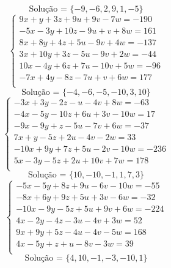 \documentclass[12pt,oneside,a4paper]{article}
\begin{document}
\begin{equation*}
\text{Solução = }\{-9,-6,2,9,1,-5\}
\end{equation*}
\vspace{\baselineskip}
\begin{equation*}
\begin{cases}
9x+y+3z+9u+9v-7w=-190 \\
-5x-3y+10z-9u+v+8w=161 \\
8x+8y+4z+5u-9v+4w=-137 \\
3x+10y+3z-5u-9v+2w=-44 \\
10x-4y+6z+7u-10v+5w=-96 \\
-7x+4y-8z-7u+v+6w=177 \\
\end{cases}
\end{equation*}
\begin{equation*}
\text{Solução = }\{-4,-6,-5,-10,3,10\}
\end{equation*}
\vspace{\baselineskip}
\begin{equation*}
\begin{cases}
-3x+3y-2z-u-4v+8w=-63 \\
-4x-5y-10z+6u+3v-10w=17 \\
-9x-9y+z-5u-7v+6w=-37 \\
7x+y-5z+2u-4v-2w=33 \\
-10x+9y+7z+5u-2v-10w=-236 \\
5x-3y-5z+2u+10v+7w=178 \\
\end{cases}
\end{equation*}
\begin{equation*}
\text{Solução = }\{10,-10,-1,1,7,3\}
\end{equation*}
\vspace{\baselineskip}
\begin{equation*}
\begin{cases}
-5x-5y+8z+9u-6v-10w=-55 \\
-8x+6y+9z+5u+3v-6w=-32 \\
-10x-9y-5z+5u+9v+6w=-224 \\
4x-2y-4z-3u-4v+3w=52 \\
9x+9y+5z-4u-4v-5w=168 \\
4x-5y+z+u-8v-3w=39 \\
\end{cases}
\end{equation*}
\begin{equation*}
\text{Solução = }\{4,10,-1,-3,-10,1\}
\end{equation*}
\end{document}
